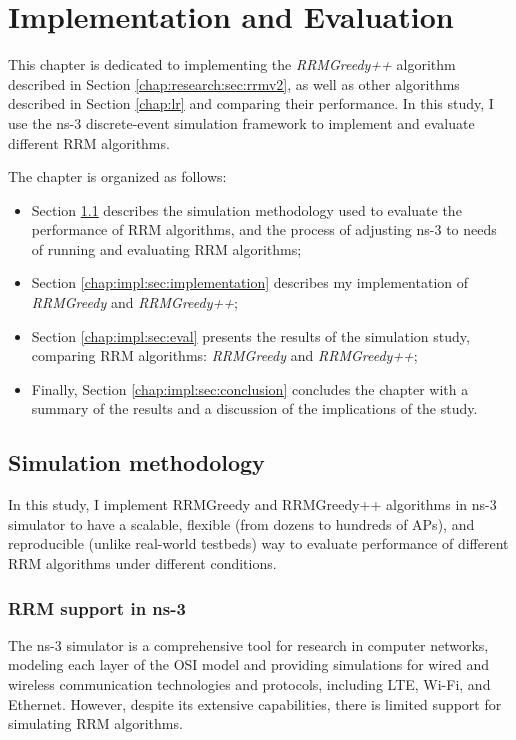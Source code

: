 \chapter{Implementation and Evaluation}
\label{chap:impl}


This chapter is dedicated to implementing the \textit{RRMGreedy++} algorithm described in Section \ref{chap:research:sec:rrmv2}, as well as other algorithms described in Section \ref{chap:lr} and comparing their performance. In this study, I use the ns-3 discrete-event simulation framework to implement and evaluate different RRM algorithms.

The chapter is organized as follows:
\begin{itemize}
    \item Section \ref{chap:impl:sec:simulation_method} describes the simulation methodology used to evaluate the performance of RRM algorithms, and the process of adjusting ns-3 to needs of running and evaluating RRM algorithms;
    \item Section \ref{chap:impl:sec:implementation} describes my implementation of \textit{RRMGreedy} and \textit{RRMGreedy++}; %
    \item Section \ref{chap:impl:sec:eval} presents the results of the simulation study, comparing RRM algorithms: \textit{RRMGreedy} and \textit{RRMGreedy++};%
    \item Finally, Section \ref{chap:impl:sec:conclusion} concludes the chapter with a summary of the results and a discussion of the implications of the study.

\end{itemize}

\section{Simulation methodology}
\label{chap:impl:sec:simulation_method}
In this study, I implement %
RRMGreedy and RRMGreedy++ algorithms in ns-3 simulator to have a scalable, flexible (from dozens to hundreds of APs), and reproducible (unlike real-world testbeds) way to evaluate performance of different RRM algorithms under different conditions.

\subsection{RRM support in ns-3}
The ns-3 simulator is a comprehensive tool for research in computer networks, modeling each layer of the OSI model and providing simulations for wired and wireless communication technologies and protocols, including LTE, Wi-Fi, and Ethernet. However, despite its extensive capabilities, there is limited support for simulating RRM algorithms.

